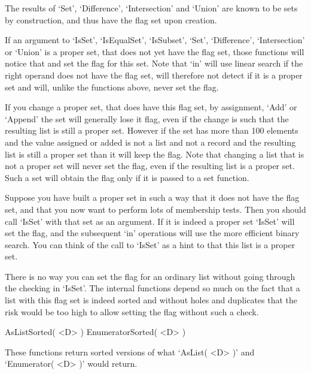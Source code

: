 The results of `Set', `Difference', `Intersection'  and `Union' are known
to be sets by construction, and thus have the flag set upon creation.

If an argument to `IsSet', `IsEqualSet', `IsSubset', `Set', `Difference',
`Intersection' or  `Union' is a proper  set, that does  not  yet have the
flag set, those functions will notice that and set the flag for this set.
Note that `in' will use linear search if the  right operand does not have
the flag set, will therefore not detect  if it is  a proper set and will,
unlike the functions above, never set the flag.

If you change a proper set, that does have this  flag set, by assignment,
`Add'   or `Append' the  set  will generally lose  it  flag,  even if the
change is such that the resulting list is still a proper set.  However if
the set has more than 100 elements and the value assigned or added is not
a list and not a record and the resulting list is still a proper set than
it will keep  the flag.  Note that  changing a list  that is not a proper
set will never set the flag, even if the resulting list  is a proper set.
Such a set will obtain the flag only if it is passed to a set function.

Suppose you have built a proper set  in such a way that  it does not have
the flag set, and that you now want  to perform lots of membership tests.
Then you  should call `IsSet'  with that set   as an argument.   If it is
indeed  a proper set  `IsSet' will set the flag,  and the subsequent `in'
operations will use  the more efficient binary  search.  You can think of
the call to `IsSet' as a hint to {\GAP} that this list is a proper set.

There is no way you can set the flag for an ordinary  list  without going
through the checking in `IsSet'.  The  internal  functions depend so much
on the fact that a list with  this flag set  is indeed sorted and without
holes and duplicates that the risk would be too high to allow setting the
flag without such a check.

\null

\>AsListSorted( <D> )
\>EnumeratorSorted( <D> )

These   functions return  sorted versions  of  what `AsList(   <D> )' and
`Enumerator( <D> )' would return.

